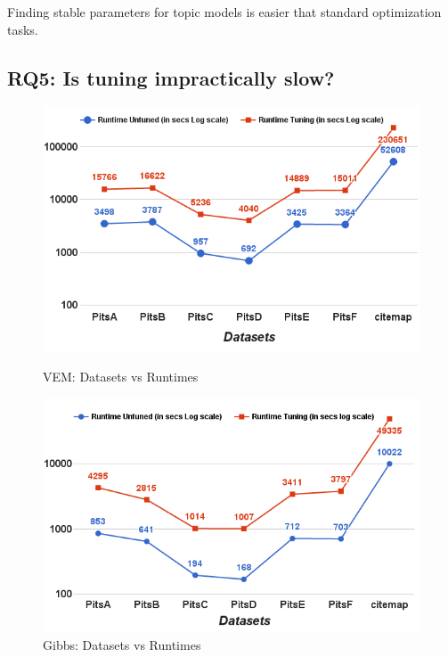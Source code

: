 \documentclass[10pt,conference]{IEEEtran}
\theoremstyle{break}
\begin{document}
\begin{lesson}
  Finding stable parameters for
  topic models is easier that standard optimization tasks.
\end{lesson}

\subsection{\textbf{RQ5: Is tuning impractically slow?}}

\begin{figure}[!t]
    \centering
  \begin{minipage}{.49\textwidth}
        \captionsetup{labelsep=space,justification=centering,singlelinecheck=off}
        \includegraphics[width=\linewidth]{./fig/Run_VEM_sci.png}
  \caption{VEM: Datasets vs Runtimes}
  \label{RQ5 VEM}
  \end{minipage}
  \begin{minipage}{.49\textwidth}
        \captionsetup{justification=centering,singlelinecheck=off}
        \includegraphics[width=\linewidth]{./fig/Run_gibbs_sci.png}
  \caption{Gibbs: Datasets vs Runtimes}
  \label{RQ5 Gibbs}
    \end{minipage}%
    
\end{figure}
\end{document}
